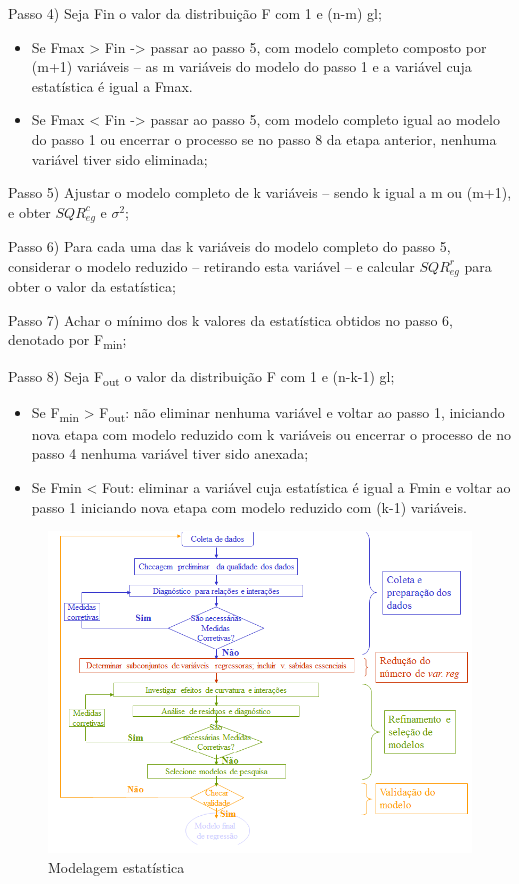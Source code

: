 \documentclass[12pt,brazil,]{book}
\begin{document}
Passo 4) Seja Fin o valor da distribuição F com 1 e (n-m) gl;

\begin{itemize}
\item
  Se Fmax \textgreater{} Fin -\textgreater{} passar ao passo 5, com
  modelo completo composto por (m+1) variáveis -- as m variáveis do
  modelo do passo 1 e a variável cuja estatística é igual a Fmax.
\item
  Se Fmax \textless{} Fin -\textgreater{} passar ao passo 5, com modelo
  completo igual ao modelo do passo 1 ou encerrar o processo se no passo
  8 da etapa anterior, nenhuma variável tiver sido eliminada;
\end{itemize}

Passo 5) Ajustar o modelo completo de k variáveis -- sendo k igual a m
ou (m+1), e obter \(SQR^{c}_{eg}\) e \(\sigma^{2}\);

Passo 6) Para cada uma das k variáveis do modelo completo do passo 5,
considerar o modelo reduzido -- retirando esta variável -- e calcular
\(SQR^{r}_{eg}\) para obter o valor da estatística;

Passo 7) Achar o mínimo dos k valores da estatística obtidos no passo 6,
denotado por F\textsubscript{min};

Passo 8) Seja F\textsubscript{out} o valor da distribuição F com 1 e
(n-k-1) gl;

\begin{itemize}
\item
  Se F\textsubscript{min} \textgreater{} F\textsubscript{out}: não
  eliminar nenhuma variável e voltar ao passo 1, iniciando nova etapa
  com modelo reduzido com k variáveis ou encerrar o processo de no passo
  4 nenhuma variável tiver sido anexada;
\item
  Se Fmin \textless{} Fout: eliminar a variável cuja estatística é igual
  a Fmin e voltar ao passo 1 iniciando nova etapa com modelo reduzido
  com (k-1) variáveis.
\end{itemize}

\begin{figure}
\centering
\includegraphics{regress1.png}
\caption{Modelagem estatística}
\end{figure}
\end{document}

